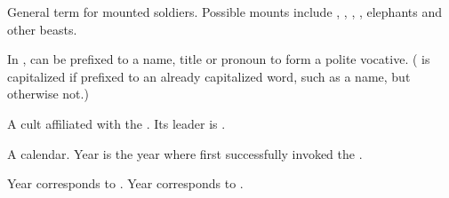 \begin{gloss}
\begin{comment}
\paragraph{cavalry}
\end{comment}
General term for mounted soldiers. 
Possible mounts include \relcs, \mikshas, \grulcans, \mulgrons, elephants and other beasts. 







\begin{comment}
\paragraph{\dai}
\end{comment}
\gitem{\dai}
In , \quo{\dai} can be prefixed to a name, title or pronoun to form a polite vocative. 
(\quo{\Dai-} is capitalized if prefixed to an already capitalized word, such as a name, but otherwise not.)







\begin{comment}
\paragraph{Dark Crescent}
\end{comment}
A cult affiliated with the . 
Its leader is . 







\begin{comment}
\paragraph{\Draconian{} Supremacy calendar}
\end{comment}
A \draconic{} calendar. 
Year  is the year where \TyarithXserasshana{} first successfully invoked the \xss. 

Year  corresponds to . 
Year  corresponds to . 










\end{gloss}
